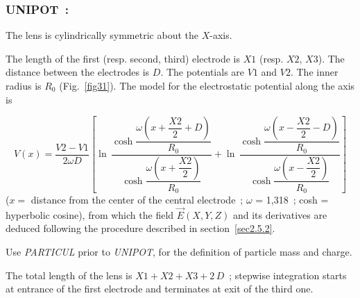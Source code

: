 \newpage

\subsubsection*{UNIPOT~: \UNIPOTTitl} \label{UNIPOT} 
\medskip 

The lens is cylindrically symmetric about the $ X$-axis.  
\medskip

\noindent The length of the first (resp. second, third) electrode is $ X1 $
(resp. $ X2$, $X3$). The distance between the electrodes is $ D$.  
The potentials are $ V1 $ and $V2$.  The inner radius is $ R_0 $ (Fig.~\ref{fig31}).  
The model for the electrostatic potential along the axis is~\cite{Biblio19}  %

$$ V(x) = 
    \dfrac{V2-V1 }{ 2\omega D} \left[
    \ln\, \dfrac{\cosh 
    	\dfrac{\omega \left(x+ \dfrac{X2}{ 2}+D \right) }{ R_0} }{
       \cosh \dfrac{\omega \left(x+\dfrac{X2 }{ 2}\right) }{ R_0}}  
    + \ln\,  \dfrac{\cosh \dfrac{\omega \left(x-\dfrac{X2 }{ 2}-D\right) }{R_0} }{
       \cosh \dfrac{\omega \left(x-\dfrac{X2 }{ 2}\right) }{R_0} }
     \right] $$
%
($ x  = $ distance from the center of the central electrode~;
$\omega$  = 1,318~; cosh = hyperbolic cosine), from which the field $ \vec  E(X,Y,Z) $ and its
derivatives are deduced following the procedure described in section~\ref{sec2.5.2}. 

\medskip

\noindent Use \textsl{PARTICUL} prior to \textsl{UNIPOT}, for the
 definition of particle mass and charge.

\medskip

\noindent The total length of the lens is $X1+X2+X3+2\,D$~; stepwise integration starts 
at entrance of the first electrode and terminates at exit of the third one. 

\vfill

